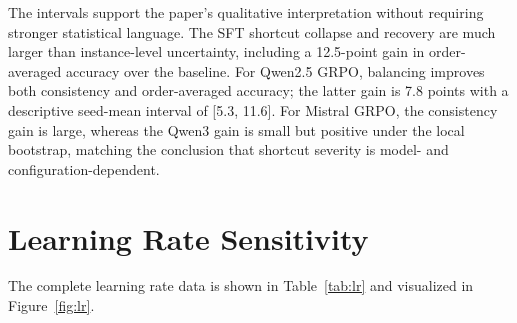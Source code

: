 \documentclass[letterpaper]{article}
\begin{document}
\begin{table}[H]
\centering
\scriptsize
\setlength{\tabcolsep}{3pt}
\caption{Bootstrap uncertainty checks. Diff is after $-$ before in percentage points. Single-run SFT rows use paired-instance bootstrap; multi-seed GRPO rows use seed-mean bootstrap.}
\label{tab:uncertainty}
\end{table}

The intervals support the paper's qualitative interpretation without requiring stronger statistical language. The SFT shortcut collapse and recovery are much larger than instance-level uncertainty, including a 12.5-point gain in order-averaged accuracy over the baseline. For Qwen2.5 GRPO, balancing improves both consistency and order-averaged accuracy; the latter gain is 7.8 points with a descriptive seed-mean interval of [5.3, 11.6]. For Mistral GRPO, the consistency gain is large, whereas the Qwen3 gain is small but positive under the local bootstrap, matching the conclusion that shortcut severity is model- and configuration-dependent.

\section{Learning Rate Sensitivity}
\label{app:lr}

The complete learning rate data is shown in Table~\ref{tab:lr} and visualized in Figure~\ref{fig:lr}.
\end{document}
